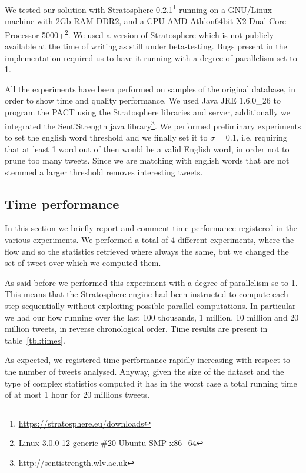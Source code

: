 We tested our solution with Stratosphere 0.2.1\footnote{\url{https://stratosphere.eu/downloads}} running on a GNU/Linux machine with 2Gb RAM DDR2, and a CPU AMD Athlon\texttrademark 64bit X2 Dual Core Processor 5000+\footnote{Linux 3.0.0-12-generic \#20-Ubuntu SMP x86\_64}. 
We used a version of Stratosphere which is not publicly available at the time of writing as still under beta-testing.
Bugs present in the implementation required us to have it running with a degree of parallelism set to 1.

All the experiments have been performed on samples of the original database, in order to show time and quality performance. 
We used Java JRE 1.6.0\_26 to program the PACT using the Stratosphere libraries and server, additionally we integrated the SentiStrength java library\footnote{\url{http://sentistrength.wlv.ac.uk}}. 
We performed preliminary experiments to set the english word threshold and we finally set it to $\sigma=0.1$, i.e. requiring that at least 1 word out of then would be a valid English word, in order not to prune too many tweets. 
Since we are matching with english words that are not stemmed a larger threshold removes interesting tweets.  

\subsection{Time performance}
In this section we briefly report and comment time performance registered in the various experiments.
We performed a total of 4 different experiments, where the flow and so the statistics retrieved where always the same, but we changed the set of tweet over which we computed them.

As said before we performed this experiment with a degree of parallelism se to 1.
This means that the Stratosphere engine had been instructed to compute each step sequentially without exploiting possible parallel computations.
In particular we had our flow running over the last 100 thousands, 1 million, 10 million and 20 million tweets, in reverse chronological order.
Time results are present in table~\ref{tbl:times}. 

As expected, we registered time performance rapidly increasing with respect to the number of tweets analysed.
Anyway, given the size of the dataset and the type of complex statistics computed it has in the worst case a total running time of at most 1 hour for 20 millions tweets.

